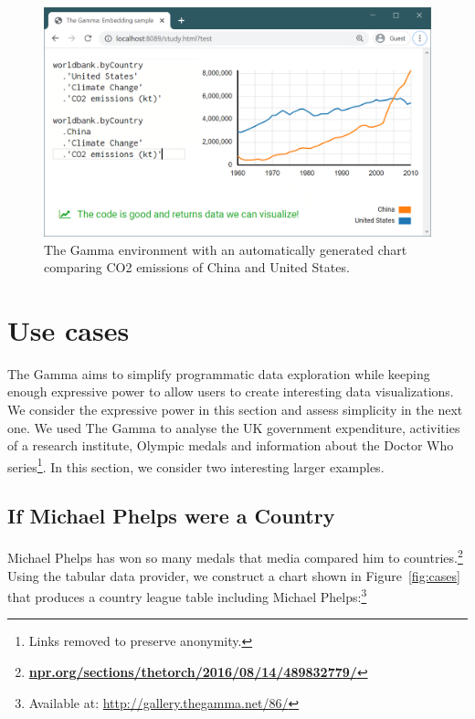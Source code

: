 \documentclass[manuscript,review,anonymous]{acmart}
\begin{document}
\begin{figure}
\includegraphics[width=1\columnwidth]{figures/sidebyside}
\caption{The Gamma environment with an automatically generated chart comparing CO2 emissions
of China and United States.}
\label{fig:sidebyside}
\end{figure}



\section{Use cases}
\label{sec:cases}

The Gamma aims to simplify programmatic data exploration while keeping enough expressive power
to allow users to create interesting data visualizations. We consider the expressive power in
this section and assess simplicity in the next one. We used The Gamma to analyse
the UK government expenditure, activities of a research institute, Olympic medals and
information about the Doctor Who series\footnote{Links removed to preserve anonymity.}.
In this section, we consider two interesting larger examples.

\subsection{If Michael Phelps were a Country}
Michael Phelps has won so many medals that media compared him to
countries.\footnote{\href{https://www.npr.org/sections/thetorch/2016/08/14/489832779/}{\small\bf\ttfamily npr.org/sections/thetorch/2016/08/14/489832779/}}
Using the tabular data provider, we construct a chart shown in Figure~\ref{fig:cases} that
produces a country league table including Michael Phelps:\footnote{Available at: \url{http://gallery.thegamma.net/86/}}
\end{document}
